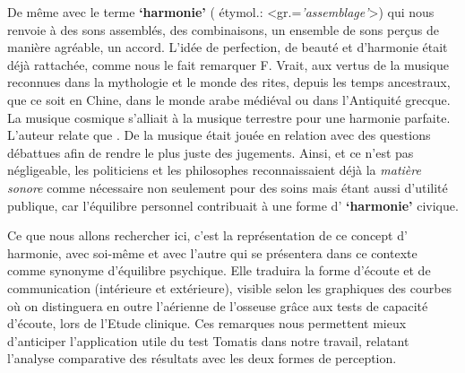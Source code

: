 De même avec le terme \textbf{`harmonie'} ( étymol.:
<gr.=\textit{'assemblage'}>) qui nous renvoie à
 des sons assemblés, des combinaisons, un ensemble de sons perçus de
 manière agréable, un accord. L'idée de perfection, de beauté et d'harmonie était déjà rattachée, comme 
 nous le fait remarquer F. Vrait, aux  vertus de la musique reconnues dans la mythologie et le
 monde des rites, depuis les temps ancestraux, que ce soit en Chine, dans le monde arabe
 médiéval ou dans l'Antiquité grecque. La musique cosmique s'alliait  à la musique terrestre pour une harmonie parfaite.
 L'auteur relate que  \autocite[80]{vrait_musicotherapie_2018}. De la musique était jouée en relation avec des questions débattues afin de rendre le plus juste des jugements.
Ainsi, et ce n'est pas négligeable, les  politiciens  et les
philosophes reconnaissaient déjà la \textit{matière sonore} comme nécessaire non seulement pour  des soins mais étant aussi d'utilité
publique, car l'équilibre personnel contribuait à une forme d' \textbf{`harmonie'} civique.
 

Ce que nous allons rechercher ici, c'est la représentation de ce concept d' harmonie, avec soi-même et 
avec l'autre qui se présentera dans ce contexte comme synonyme d'équilibre
psychique. Elle traduira la forme d'écoute et de communication (intérieure et
extérieure), visible selon les graphiques %
 des courbes %
 où on distinguera en outre l'aérienne de l'osseuse grâce aux tests de capacité 
 d'écoute, lors de l'Etude clinique.
Ces remarques nous permettent mieux d'anticiper
l'application utile du test Tomatis dans notre travail, relatant l'analyse
comparative des résultats avec les deux formes de perception.


